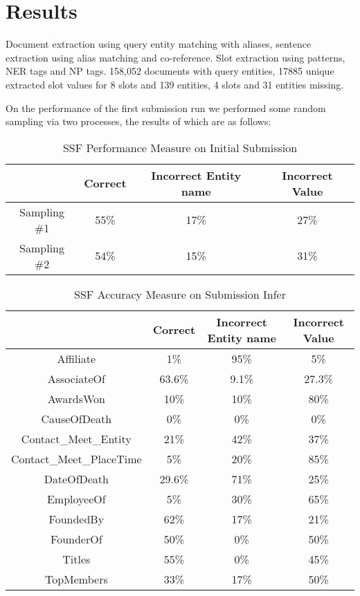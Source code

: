 
\section{Results}

Document extraction using query entity matching with aliases, sentence 
extraction using alias matching and co-reference. Slot extraction using 
patterns, NER tags and NP tags. 158,052 documents with query entities, 17885 
unique extracted slot values for 8 slots and 139 entities, 4 slots and 31 
entities missing.

On the performance of the first submission run we performed some random 
sampling via two processes, the results of which are as follows:

\begin{table}[b]
\caption{SSF Performance Measure on Initial Submission }
\centering
\begin{tabular}{|c|c|c|c|}
\hline 
 & Correct & Incorrect Entity name & Incorrect Value \\ 
\hline 
Sampling \#1 & 55\% & 17\% & 27\% \\ 
\hline Sampling \#2 & 54\% & 15\% & 31\%  \\ 
\hline 
\end{tabular} 
\end{table}

\begin{table}
\caption{SSF Accuracy Measure on Submission Infer }
\centering
\begin{tabular}{|c|c|c|c|}
\hline 
 & Correct & Incorrect Entity name & Incorrect Value \\ 
\hline 
Affiliate & 1\% & 95\% & 5\% \\ \hline 
AssociateOf & 63.6\% & 9.1\% & 27.3\%  \\ \hline 
AwardsWon & 10\% & 10\% & 80\%  \\ \hline 
CauseOfDeath & 0\% & 0\% & 0\%  \\ \hline 
Contact\_Meet\_Entity & 21\% & 42\% & 37\%  \\ \hline 
Contact\_Meet\_PlaceTime & 5\% & 20\% & 85\%  \\ \hline 
DateOfDeath & 29.6\% & 71\% & 25\%  \\ \hline 
EmployeeOf & 5\% & 30\% & 65\%  \\ \hline 
FoundedBy & 62\% & 17\% & 21\%  \\ \hline 
FounderOf & 50\% & 0\% & 50\%  \\ \hline 
Titles & 55\% & 0\% & 45\%  \\ \hline 
TopMembers & 33\% & 17\% & 50\%  \\ \hline 

\end{tabular} 
\end{table}







